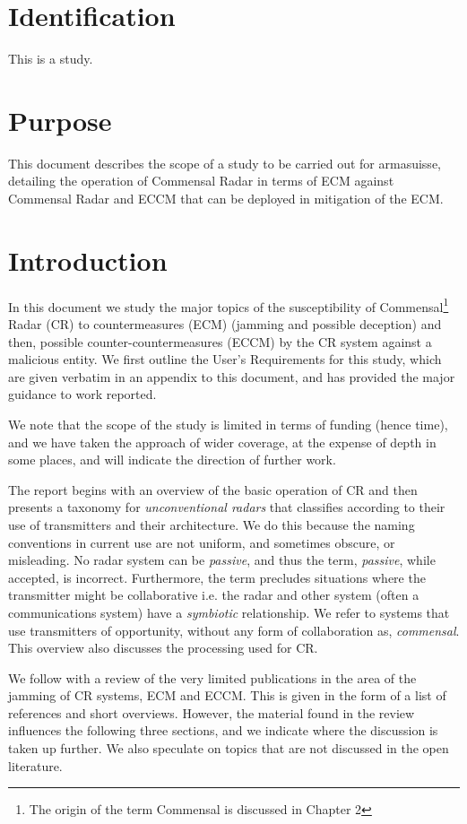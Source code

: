 \documentclass[english, 12pt]{report}
\begin{document}
\section{Identification}

This is a study.


\section{Purpose}

This document describes the scope of a study to be carried out for armasuisse, detailing the operation of Commensal Radar in terms of ECM against Commensal Radar and ECCM that can be deployed in mitigation of the ECM.

%
\section{Introduction}


In this document we study the major topics of the susceptibility of Commensal\footnote{The origin of the term Commensal is discussed in Chapter 2} Radar (CR) to countermeasures (ECM) (jamming and possible deception) and then,  possible counter-countermeasures (ECCM) by the CR system against a malicious entity. We first outline the User's Requirements for this study, which are given verbatim in an appendix to this document, and has provided the major guidance to work reported.

We note that the scope of the study is limited in terms of funding (hence time), and we have taken the approach of wider coverage, at the expense of depth in some places, and will indicate the direction of further work.

The report begins with an overview of the basic operation of CR and then presents a taxonomy for \emph{unconventional radars} that classifies according to their use of transmitters and their architecture. We do this because the naming conventions in current use are not uniform, and sometimes obscure, or misleading. No radar system can be \emph{passive}, and thus the term, \emph{passive}, while accepted, is incorrect. Furthermore, the term precludes situations where the transmitter might be collaborative i.e. the radar and other system (often a communications system) have a \emph{symbiotic} relationship. We refer to systems that use transmitters of opportunity, without any form of collaboration as, \emph{commensal}. This overview also discusses the processing used for CR.

We follow with a review of the very limited publications in the area of the jamming of CR systems, ECM and ECCM. This is given in the form of a list of references and short overviews. However, the material found in the review influences the following three sections, and we indicate where the discussion is taken up further. We also speculate on topics that are not discussed in the open literature. 
\end{document}
